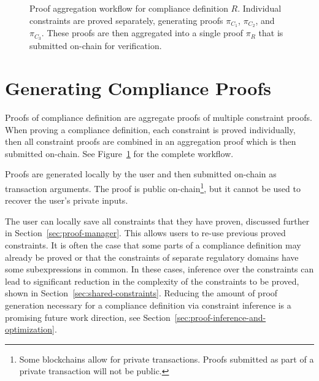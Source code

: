 \documentclass[9pt]{extreport}
\begin{document}
\begin{figure}[htbp]
\caption[Proof aggregation workflow]{Proof aggregation workflow for compliance definition $R$. Individual constraints are proved separately, generating proofs $\pi_{C_1}$, $\pi_{C_2}$, and $\pi_{C_3}$. These proofs are then aggregated into a single proof $\pi_R$ that is submitted on-chain for verification.}
\label{fig:proof-aggregation-layered}
\end{figure}

\section{Generating Compliance Proofs}
\label{sec:generating-compliance-proofs}

Proofs of compliance definition are aggregate proofs of multiple constraint proofs.  When proving a compliance definition, each constraint is proved individually, then all constraint proofs are combined in an aggregation proof which is then submitted on-chain.  See Figure~\ref{fig:proof-aggregation-layered} for the complete workflow.

Proofs are generated locally by the user and then submitted on-chain as transaction arguments.  The proof is public on-chain\footnote{Some blockchains allow for private transactions.  Proofs submitted as part of a private transaction will not be public.}, but it cannot be used to recover the user's private inputs.

The user can locally save all constraints that they have proven, discussed further in Section~\ref{sec:proof-manager}.  This allows users to re-use previous proved constraints.  It is often the case that some parts of a compliance definition may already be proved or that the constraints of separate regulatory domains have some subexpressions in common.  In these cases, inference over the constraints can lead to significant reduction in the complexity of the constraints to be proved, shown in Section~\ref{sec:shared-constraints}.  Reducing the amount of proof generation necessary for a compliance definition via constraint inference is a promising future work direction, see Section~\ref{sec:proof-inference-and-optimization}.
\end{document}
